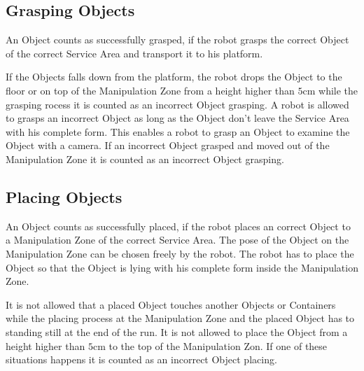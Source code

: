 




\subsection{Grasping Objects} \label{ssec:GraspingObjects}

An Object counts as successfully grasped, if the robot grasps the correct Object of the correct Service Area and transport it to his platform. 

If the Objects falls down from the platform, the robot drops the Object to the floor or on top of the Manipulation Zone from a height higher than $5\si{\centi\meter}$ while the grasping rocess it is counted as an incorrect Object grasping. A robot is allowed to grasps an incorrect Object as long as the Object don't leave the Service Area with his complete form. This enables a robot to grasp an Object to examine the Object with a camera. If an incorrect Object grasped and moved out of the Manipulation Zone it is counted as an incorrect Object grasping.


\subsection{Placing Objects} \label{ssec:PlacingObjects}

An Object counts as successfully placed, if the robot places an correct Object to a Manipulation Zone of the correct Service Area. The pose of the Object on the Manipulation Zone can be chosen freely by the robot. The robot has to place the Object so that the Object is lying with his complete form inside the Manipulation Zone. 

It is not allowed that a placed Object touches another Objects or Containers while the placing process at the Manipulation Zone and the placed Object has to standing still at the end of the run. It is not allowed to place the Object from a height higher than $5\si{\centi\meter}$ to the top of the Manipulation Zon. If one of these situations happens it is counted as an incorrect Object placing.

